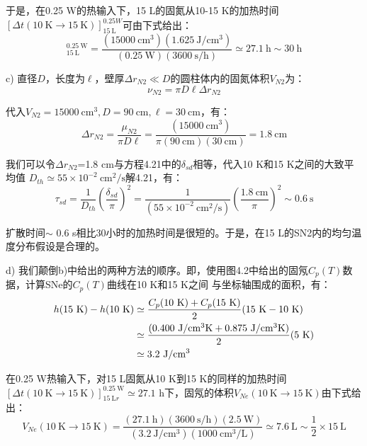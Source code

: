 于是，在0.25 W的热输入下，15 L的固氮从10-15 K的加热时间$[\Delta t(10\ \mathrm{K}\rightarrow 15\ \mathrm{K})]_{15\ \mathrm{L}}^{0.25 W}$可由下式给出： 
\begin{equation*}%
[\Delta(10\ \mathrm{K} \rightarrow 15\ \mathrm{K})]_{15\ \mathrm{L}}^{0.25\ \mathrm{W}}=\frac{(15000\ \mathrm{cm^3})(1.625\ \mathrm{J/cm^3})}{(0.25\ \mathrm{W})(3600\ \mathrm{s/h})}\simeq 27.1\ \mathrm{h}\sim 30\ \mathrm{h}
\end{equation*}

c) 直径$D$，长度为$\ell$，壁厚$\Delta r_{N2}\ll D$的圆柱体内的固氮体积$V_{N2}$为：
\begin{equation*}%
\nu_{N2}=\pi D\ell\Delta r_{N2} \tag{S3.1}
\end{equation*}

代入$V_{N2}=15000\ \mathrm{cm^3},D=90\ \mathrm{cm},\ell= 30\ \mathrm{cm}$，有：
\begin{equation*}%
\Delta r_{N2}=\frac{\mu_{N2}}{\pi D\ell}=\frac{(15000\ \mathrm{cm^3})}{\pi(90\ \mathrm{cm})(30\ \mathrm{cm})}=1.8\ \mathrm{cm}
\end{equation*}

我们可以令$\Delta r_{N2}$=1.8 cm与方程4.21中的$\delta_{sd}$相等，代入10 K和15 K之间的大致平均值
$D_{th}\simeq 55\times10^{−2}\ \mathrm{cm^2/s}$解4.21，有：
\begin{equation}%
\tau_{sd}=\frac{1}{D_{th}}(\frac{\delta_{sd}}{\pi})^2
=\frac{1}{(55\times 10^{-2}\ \mathrm{cm^2/s})}(\frac{1.8\ \mathrm{cm}}{\pi})^2\sim 0.6\ \mathrm{s}
\end{equation}

扩散时间$\sim$ 0.6 s相比30小时的加热时间是很短的。于是，在15 L的SN2内的均匀温度分布假设是合理的。

d) 我们颠倒b)中给出的两种方法的顺序。即，使用图4.2中给出的固氖$C_p(T)$数据，计算SNe的$C_p(T)$曲线在10 K和15 K之间
与坐标轴围成的面积，有：
\begin{align*}%
h(15\ \mathrm{K})-h(10\ \mathrm{K})&\simeq\frac{C_p(10\ \mathrm{K})+C_p(15\ \mathrm{K})}{2}(15\ \mathrm{K}-10\ \mathrm{K})\\\notag
&\simeq\frac{(0.400\ \mathrm{J/cm^3K}+0.875\ \mathrm{J/cm^3K})}{2}(5\ \mathrm{K})\\\notag
&\simeq 3.2\ \mathrm{J/cm^3}
\end{align*}

在0.25 W热输入下，对15 L固氮从10 K到15 K的同样的加热时间$[\Delta t(10\ \mathrm{K}\rightarrow 15\ \mathrm{K})]_{15\ \mathrm{L}r}^{0.25\ \mathrm{W}}\simeq 27.1$ h下，固氖的体积$V_{Ne}(10\ \mathrm{K}\rightarrow 15\ \mathrm{K})$由下式给出：
\begin{equation*}%
V_{Ne}(10\ \mathrm{K} \rightarrow 15\ \mathrm{K})=\frac{(27.1\ \mathrm{h})(3600\ \mathrm{s/h} )(2.5\ \mathrm{W})}{(3.2\ \mathrm{J/cm^3})(1000 \ \mathrm{cm^3/L})}
\simeq 7.6\ \mathrm{L}\sim\frac{1}{2}\times 15\ \mathrm{L}
\end{equation*}

